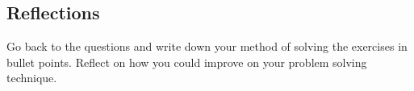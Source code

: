 \documentclass[12pt]{article}
\begin{document}
\subsection*{Reflections}
Go back to the questions and write down your method of solving the exercises in bullet points.
Reflect on how you could improve on your problem solving technique. 

\end{document}
